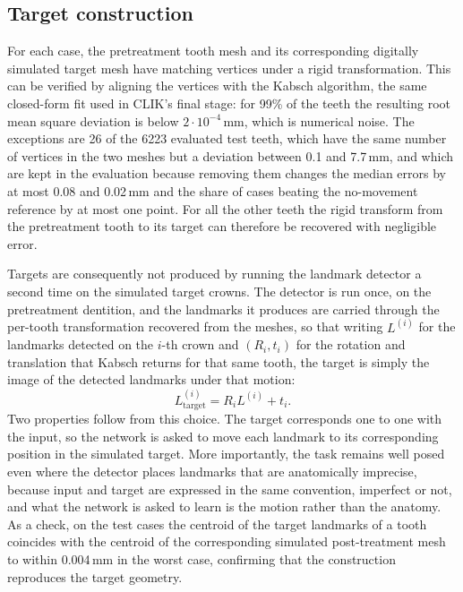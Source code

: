 \documentclass[10pt,a4paper]{article}
\begin{document}
\subsection{Target construction}
\label{sec:targets}

For each case, the pretreatment tooth mesh and its corresponding digitally simulated target mesh have matching vertices under a rigid transformation. This can be verified by aligning the vertices with the Kabsch algorithm, the same closed-form fit used in CLIK's final stage: for 99\% of the teeth the resulting root mean square deviation is below $2\cdot10^{-4}$\,mm, which is numerical noise. The exceptions are 26 of the 6223 evaluated test teeth, which have the same number of vertices in the two meshes but a deviation between 0.1 and 7.7\,mm, and which are kept in the evaluation because removing them changes the median errors by at most 0.08\degree{} and 0.02\,mm and the share of cases beating the no-movement reference by at most one point. For all the other teeth the rigid transform from the pretreatment tooth to its target can therefore be recovered with negligible error.

Targets are consequently not produced by running the landmark detector a second time on the simulated target crowns. The detector is run once, on the pretreatment dentition, and the landmarks it produces are carried through the per-tooth transformation recovered from the meshes, so that writing $L^{(i)}$ for the landmarks detected on the $i$-th crown and $(R_i, t_i)$ for the rotation and translation that Kabsch returns for that same tooth, the target is simply the image of the detected landmarks under that motion:
\begin{equation}
L^{(i)}_{\text{target}} = R_i L^{(i)} + t_i .
\end{equation}
Two properties follow from this choice. The target corresponds one to one with the input, so the network is asked to move each landmark to its corresponding position in the simulated target. More importantly, the task remains well posed even where the detector places landmarks that are anatomically imprecise, because input and target are expressed in the same convention, imperfect or not, and what the network is asked to learn is the motion rather than the anatomy. As a check, on the test cases the centroid of the target landmarks of a tooth coincides with the centroid of the corresponding simulated post-treatment mesh to within 0.004\,mm in the worst case, confirming that the construction reproduces the target geometry.
\end{document}
